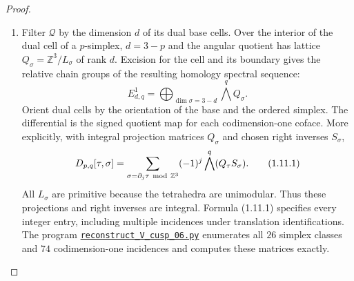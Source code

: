 \begin{proof}
\begin{enumerate}[label={$\langle1\rangle$\arabic*.}]
The polar maps agree under the integral monomial overlaps.
At $C(q)=0$ the deck multipliers have positive real values, so the
logarithmic fibre at angle one is the product of the base and angular
three-tori in item~3, with their given markings.

The mapping-cylinder comparison for a proper vertical log-smooth
family identifies this logarithmic forgetful map with the nearby-fibre collapse, compatibly with the central strata
\cite[formula (3-3-1), p.~478; Theorem 4.1.1 and Lemmas
4.1.2--4.1.3, pp.~480--482]{ffAchingerOgus20}.
Its angular cycles are $a_j$ and its base cycles are $b_j$.
In these column-basis conventions monodromy fixes each $a_j$
and sends $b_j$ to $b_j+a_j$, as specified by $Nb_j=a_j$.
The stratified deformation in item~1 transports this map
back to the original bounded period matrix.

\item Filter $\mathcal Q$ by the dimension $d$ of its dual base cells.
Over the interior of the dual cell of a $p$-simplex, $d=3-p$ and the
angular quotient has lattice
$Q_\sigma=\mathbb Z^3/L_\sigma$ of rank $d$.
Excision for the cell and its boundary gives the relative chain
groups of the resulting homology spectral sequence:
\[
E^1_{d,q}=\bigoplus_{\dim\sigma=3-d}\bigwedge^qQ_\sigma.
\]
Orient dual cells by the orientation of the base and the ordered
simplex.  The differential is the signed quotient map for each
codimension-one coface.  More explicitly, with integral projection
matrices $Q_\sigma$ and chosen right inverses $S_\sigma$,
\[
D_{p,q}[\tau,\sigma]=
 \sum_{\sigma=\partial_j\tau\ {\rm mod}\ \mathbb Z^3}
 (-1)^j\bigwedge^q(Q_\tau S_\sigma).
\tag{1.11.1}
\]
All $L_\sigma$ are primitive because the tetrahedra are unimodular.
Thus these projections and right inverses are integral.  Formula
(1.11.1) specifies every integer entry, including multiple incidences
under translation identifications.  The program \href{https://github.com/KokunoYumeto/s6-complex-structure-workbench/blob/83d76022bcd442278b760db9ff438afceed6c6ea/pro_returns/S6_SERIES_GRIND_checkpoint_10_20261120T0211Z/code/current_audits/audit_corrections/code/reconstruct_V_cusp_06.py}{\texttt{reconstruct\_V\_cusp\_06.py}} enumerates all $26$ simplex classes and $74$ codimension-one incidences and computes these matrices exactly.


\end{enumerate}
\end{proof}

